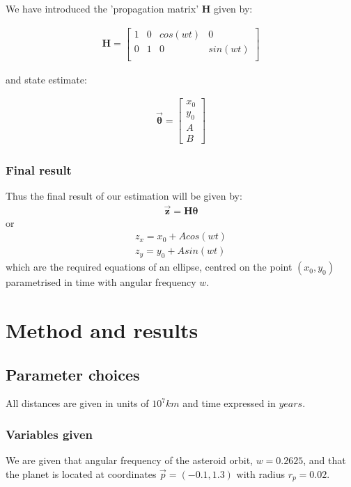 \documentclass[a4paper]{article}
\begin{document}
		\noindent  We have introduced the 'propagation matrix' $\bm{H}$ given by:
		
		\begin{align}
		\bm{H}=
		\begin{bmatrix}
		1 & 0 & cos(wt) & 0 \\
		0 & 1 & 0 & sin(wt) \\
		\end{bmatrix}
		\end{align}
		
		\noindent and state estimate:
		
		\begin{align}
		\bm{\vec{\theta}}=\begin{bmatrix}
			x_0\\
			y_0\\
			A \\
			B
		\end{bmatrix}
		\end{align}
		
		\subsubsection{Final result}\label{Final_result}
		Thus the final result of our estimation will be given by:
		\begin{align}
			\bm{\vec{z}}=\bm{H\theta}
		\end{align}
		\noindent or
		\begin{align}
			z_x=x_0+Acos(wt)\\
			z_y=y_0+Asin(wt)
		\end{align}
		\noindent which are the required equations of an ellipse, centred on the point $(x_0, y_0)$ parametrised in time with angular frequency $w$.
	
\clearpage
\section{Method and results}\label{Method_results}
	\subsection{Parameter choices}\label{Parameter_choices}
		All distances are given in units of $10^7 km$ and time expressed in $years$.
		\subsubsection{Variables given}\label{Variables_given}
		We are given that angular frequency of the asteroid orbit, $w=0.2625$, and that the planet is located at coordinates $\vec{p}=(-0.1, 1.3)$ with radius $r_p=0.02$.\\
\end{document}
